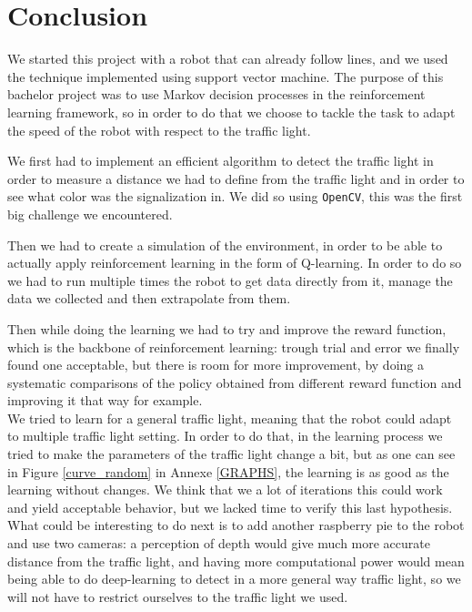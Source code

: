 \documentclass[14pt,a4paper]{article}
\theoremstyle{definition}
\begin{document}
\newpage
\section*{Conclusion}

We started this project with a robot that can already follow lines, and we used the technique implemented using support vector machine. The purpose of this bachelor project was to use Markov decision processes in the reinforcement learning framework, so in order to do that we choose to tackle the task to adapt the speed of the robot with respect to the traffic light.

We first had to implement an efficient algorithm to detect the traffic light in order to measure a distance we had to define from the traffic light and in order to see what color was the signalization in. We did so using \texttt{OpenCV}, this was the first big challenge we encountered.

Then we had to create a simulation of the environment, in order to be able to actually apply reinforcement learning in the form of Q-learning. In order to do so we had to run multiple times the robot to get data directly from it, manage the data we collected and then extrapolate from them.

Then while doing the learning we had to try and improve the reward function, which is the backbone of reinforcement learning: trough trial and error we finally found one acceptable, but there is room for more improvement, by doing a systematic comparisons of the policy obtained from different reward function and improving it that way for example.\\


We tried to learn for a general traffic light, meaning that the robot could adapt to multiple traffic light setting. In order to do that, in the learning process we tried to make the parameters of the traffic light change a bit, but as one can see in Figure \ref{curve_random} in Annexe \ref{GRAPHS}, the learning is as good as the learning without changes. We think that we a lot of iterations this could work and yield acceptable behavior, but we lacked time to verify this last hypothesis.\\


What could be interesting to do next is to add another raspberry pie to the robot and use two cameras: a perception of depth would give much more accurate distance from the traffic light, and having more computational power would mean being able to do deep-learning to detect in a more general way traffic light, so we will not have to restrict ourselves to the traffic light we used.
\end{document}
